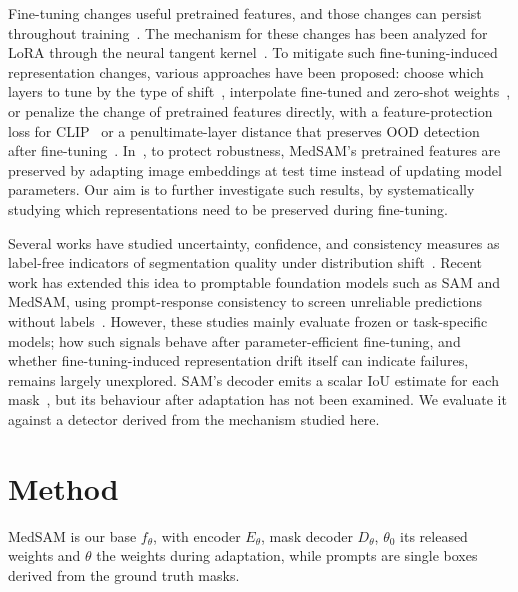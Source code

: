 \documentclass[runningheads]{llncs}
\begin{document}
Fine-tuning changes useful pretrained features, and those changes can persist throughout training~\cite{kumar2022finetuning}. The mechanism for these changes has been analyzed for LoRA through the neural tangent kernel~\cite{tomihari2024ntk}. To mitigate such fine-tuning-induced representation changes, various approaches have been proposed: choose which layers to tune by the type of shift~\cite{lee2023surgical}, interpolate fine-tuned and zero-shot weights~\cite{wortsman2022wiseft}, or penalize the change of pretrained features directly, with a feature-protection loss for CLIP~\cite{tan2024protection} or a penultimate-layer distance that preserves OOD detection after fine-tuning~\cite{zhang2025oodreg}. In~\cite{chen2025tta}, to protect robustness, MedSAM's pretrained features are preserved by adapting image embeddings at test time instead of updating model parameters. Our aim is to further investigate such results, by systematically studying which representations need to be preserved during fine-tuning.

Several works have studied uncertainty, confidence, and consistency measures as label-free indicators of segmentation quality under distribution shift~\cite{zenk2024failure}. Recent work has extended this idea to promptable foundation models such as SAM and MedSAM, using prompt-response consistency to screen unreliable predictions without labels~\cite{kinalioglu2026consistency}. However, these studies mainly evaluate frozen or task-specific models; how such signals behave after parameter-efficient fine-tuning, and whether fine-tuning-induced representation drift itself can indicate failures, remains largely unexplored. SAM's decoder emits a scalar IoU estimate for each mask~\cite{kirillov2023sam}, but its behaviour after adaptation has not been examined. We evaluate it against a detector derived from the mechanism studied here.

\section{Method}
\label{sec:method}

MedSAM is our base $f_\theta$, with encoder $E_\theta$, mask decoder $D_\theta$, $\theta_0$ its released weights and $\theta$ the weights during adaptation, while prompts are single boxes derived from the ground truth masks.
\end{document}
